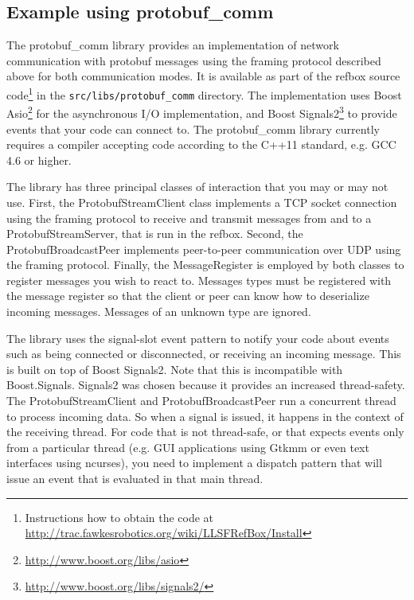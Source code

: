 \documentclass[a4paper]{article}
\begin{document}
\subsection{Example using protobuf\_comm}
The protobuf\_comm library provides an implementation of network
communication with protobuf messages using the framing protocol
described above for both communication modes. It is available as part
of the refbox source code\footnote{Instructions how to obtain the code
  at \url{http://trac.fawkesrobotics.org/wiki/LLSFRefBox/Install}} in
the \texttt{src/libs/protobuf\_comm} directory. The implementation
uses Boost Asio\footnote{\url{http://www.boost.org/libs/asio}} for the
asynchronous I/O implementation, and Boost
Signals2\footnote{\url{http://www.boost.org/libs/signals2/}} to
provide events that your code can connect to. The protobuf\_comm
library currently requires a compiler accepting code according to the
C++11 standard, e.g. GCC 4.6 or higher.

The library has three principal classes of interaction that you may or
may not use. First, the ProtobufStreamClient class implements a TCP
socket connection using the framing protocol to receive and transmit
messages from and to a ProtobufStreamServer, that is run in the
refbox. Second, the ProtobufBroadcastPeer implements peer-to-peer
communication over UDP using the framing protocol. Finally, the
MessageRegister is employed by both classes to register messages you
wish to react to. Messages types must be registered with the
message register so that the client or peer can know how to
deserialize incoming messages. Messages of an unknown type are
ignored.

The library uses the signal-slot event pattern to notify your code
about events such as being connected or disconnected, or receiving an
incoming message. This is built on top of Boost Signals2. Note that
this is incompatible with Boost.Signals. Signals2 was chosen because
it provides an increased thread-safety. The ProtobufStreamClient and
ProtobufBroadcastPeer run a concurrent thread to process incoming
data. So when a signal is issued, it happens in the context of the
receiving thread. For code that is not thread-safe, or that expects
events only from a particular thread (e.g. GUI applications using
Gtkmm or even text interfaces using ncurses), you need to implement a
dispatch pattern that will issue an event that is evaluated in that
main thread.
\end{document}
